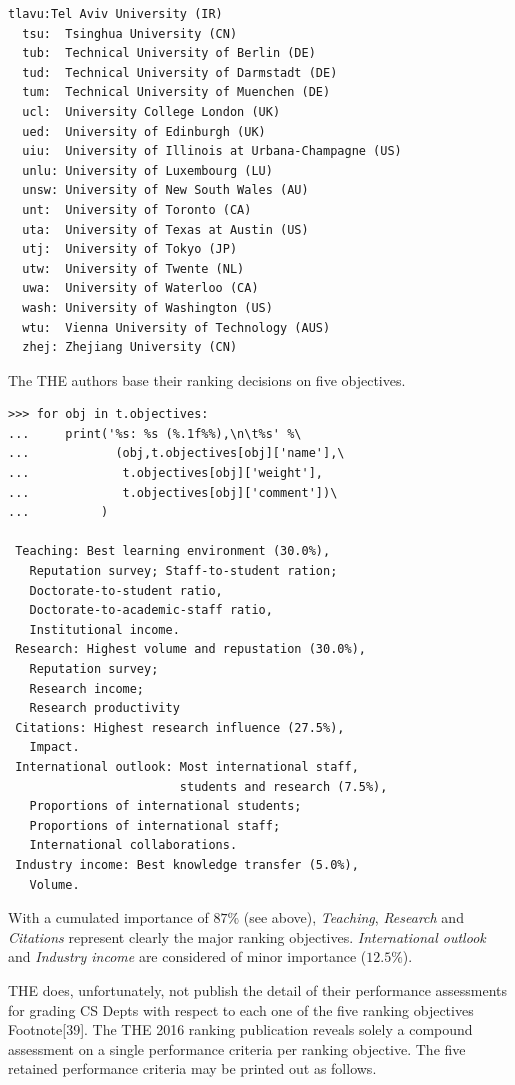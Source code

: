 \begin{lstlisting}[caption={Printing the potential decision actions},label=list:13.2]
  tlavu:Tel Aviv University (IR)
  tsu:	Tsinghua University (CN)
  tub:	Technical University of Berlin (DE)
  tud:	Technical University of Darmstadt (DE)
  tum:	Technical University of Muenchen (DE)
  ucl:	University College London (UK)
  ued:	University of Edinburgh (UK)
  uiu:	University of Illinois at Urbana-Champagne (US)
  unlu:	University of Luxembourg (LU)
  unsw:	University of New South Wales (AU)
  unt:	University of Toronto (CA)
  uta:	University of Texas at Austin (US)
  utj:	University of Tokyo (JP)
  utw:	University of Twente (NL)
  uwa:	University of Waterloo (CA)
  wash:	University of Washington (US)
  wtu:	Vienna University of Technology (AUS)
  zhej:	Zhejiang University (CN)
\end{lstlisting}

The THE authors base their ranking decisions on five objectives.

\begin{lstlisting}[caption={The THE ranking objectives},label=list:13.3]
>>> for obj in t.objectives:
...     print('%s: %s (%.1f%%),\n\t%s' %\
...            (obj,t.objectives[obj]['name'],\
...             t.objectives[obj]['weight'],
...             t.objectives[obj]['comment'])\
...          )
   
 Teaching: Best learning environment (30.0%),
   Reputation survey; Staff-to-student ration;
   Doctorate-to-student ratio,
   Doctorate-to-academic-staff ratio,
   Institutional income.
 Research: Highest volume and repustation (30.0%),
   Reputation survey;
   Research income;
   Research productivity
 Citations: Highest research influence (27.5%),
   Impact.
 International outlook: Most international staff,
                        students and research (7.5%),
   Proportions of international students;
   Proportions of international staff;
   International collaborations.
 Industry income: Best knowledge transfer (5.0%),
   Volume.
\end{lstlisting}

With a cumulated importance of $87\%$ (see above), \emph{Teaching}, \emph{Research} and \emph{Citations} represent clearly the major ranking objectives. \emph{International outlook} and \emph{Industry income} are considered of minor importance ($12.5\%$).

THE does, unfortunately, not publish the detail of their performance assessments for grading CS Depts with respect to each one of the five ranking objectives Footnote[39]. The THE 2016 ranking publication reveals solely a compound assessment on a single performance criteria per ranking objective. The five retained performance criteria may be printed out as follows.

